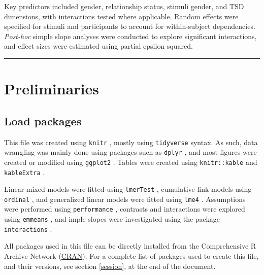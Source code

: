 \documentclass[
  bookmarksnumbered]{article}
\begin{document}
Key predictors included gender, relationship status, stimuli gender, and TSD dimensions, with interactions tested where applicable. Random effects were specified for stimuli and participants to account for within-subject dependencies. \emph{Post-hoc} simple slope analyses were conducted to explore significant interactions, and effect sizes were estimated using partial epsilon squared.

\begin{center}\rule{0.5\linewidth}{0.5pt}\end{center}

\section{Preliminaries}\label{preliminaries}

\subsection{Load packages}\label{load-packages}

This file was created using \texttt{knitr} \autocite{knitrcit}, mostly using \texttt{tidyverse} \autocite{tidyversecit} syntax. As such, data wrangling was mainly done using packages such as \texttt{dplyr} \autocite{dplyrcit}, and most figures were created or modified using \texttt{ggplot2} \autocite{ggplotcit}. Tables were created using \texttt{knitr::kable} and \texttt{kableExtra} \autocite{kableExtracit}.

Linear mixed models were fitted using \texttt{lmerTest} \autocite{lmertestcit}, cumulative link models using \texttt{ordinal} \autocite{ordinalcit}, and generalized linear models were fitted using \texttt{lme4} \autocite{lme4cit}. Assumptions were performed using \texttt{performance} \autocite{ludecke2021}, contrasts and interactions were explored using \texttt{emmeans} \autocite{emmeanscit}, and imple slopes were investigated using the package \texttt{interactions} \autocite{interactionscit}.

All packages used in this file can be directly installed from the Comprehensive R Archive Network (\href{https://cran.r-project.org/}{CRAN}). For a complete list of packages used to create this file, and their versions, see section \ref{session}, at the end of the document.
\end{document}

